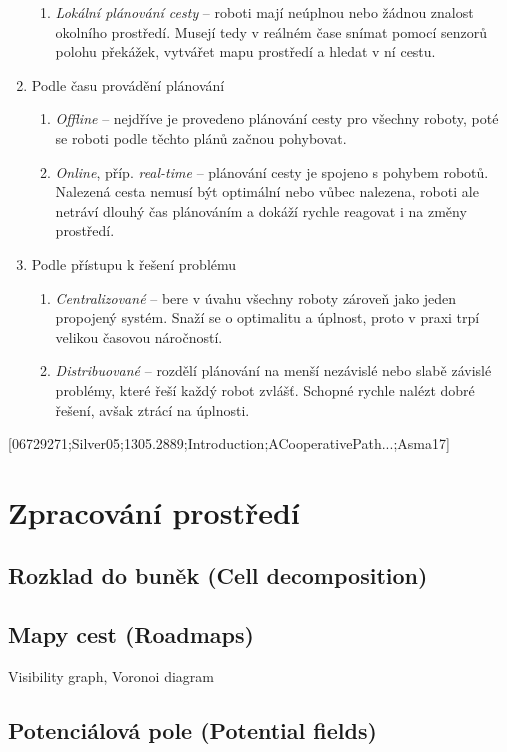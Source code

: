 \begin{enumerate}
\begin{enumerate}
		\item \emph{Lokální plánování cesty} -- roboti mají neúplnou nebo žádnou znalost okolního prostředí. Musejí tedy v reálném čase snímat pomocí senzorů polohu překážek, vytvářet mapu prostředí a hledat v ní cestu.
	\end{enumerate}
	\item Podle času provádění plánování
	\begin{enumerate}
		\item \emph{Offline} -- nejdříve je provedeno plánování cesty pro všechny roboty, poté se roboti podle těchto plánů začnou pohybovat.
		\item \emph{Online}, příp. \emph{real-time} -- plánování cesty je spojeno s pohybem robotů. Nalezená cesta nemusí být optimální nebo vůbec nalezena, roboti ale netráví dlouhý čas plánováním a dokáží rychle reagovat i na změny prostředí.
	\end{enumerate}
	\item Podle přístupu k řešení problému
	\begin{enumerate}
		\item \emph{Centralizované} -- bere v úvahu všechny roboty zároveň jako jeden propojený systém. Snaží se o optimalitu a úplnost, proto v praxi trpí velikou časovou náročností.
		\item \emph{Distribuované} -- rozdělí plánování na menší nezávislé nebo slabě závislé problémy, které řeší každý robot zvlášť. Schopné rychle nalézt dobré řešení, avšak ztrácí na úplnosti.
	\end{enumerate}
\end{enumerate}
[06729271;Silver05;1305.2889;Introduction;ACooperativePath...;Asma17]

\section{Zpracování prostředí}
\subsection{Rozklad do buněk (Cell decomposition)}
\subsection{Mapy cest (Roadmaps)}
Visibility graph, Voronoi diagram
\subsection{Potenciálová pole (Potential fields)}

